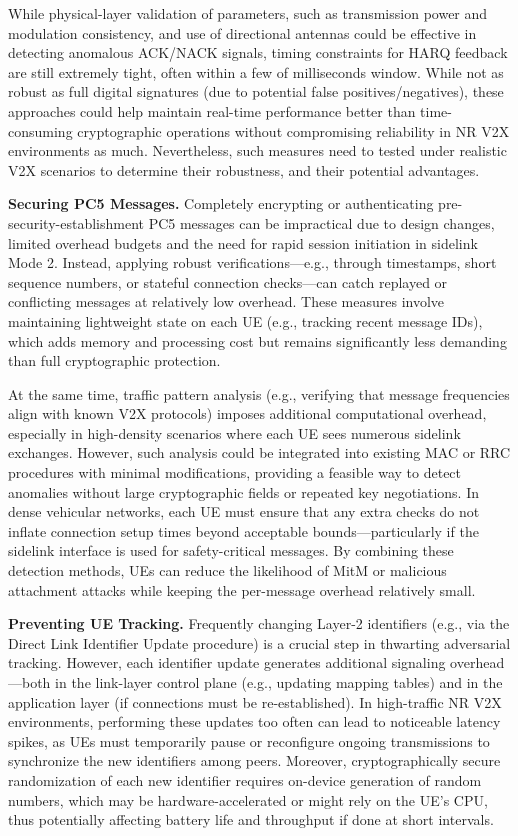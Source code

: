 While physical-layer validation of parameters, such as transmission power and modulation consistency, and use of directional antennas could be effective in detecting anomalous ACK/NACK signals, timing constraints for HARQ feedback are still extremely tight, often within a few of milliseconds window. While not as robust as full digital signatures (due to potential false positives/negatives), these approaches could help maintain real-time performance better than time-consuming cryptographic operations without compromising reliability in NR V2X environments as much. Nevertheless, such measures need to tested under realistic V2X scenarios to determine their robustness, and their potential advantages.

\textbf{Securing PC5 Messages.} Completely encrypting or authenticating pre-security-establishment PC5 messages can be impractical due to design changes, limited overhead budgets and the need for rapid session initiation in sidelink Mode 2. Instead, applying robust verifications—e.g., through timestamps, short sequence numbers, or stateful connection checks—can catch replayed or conflicting messages at relatively low overhead. These measures involve maintaining lightweight state on each UE (e.g., tracking recent message IDs), which adds memory and processing cost but remains significantly less demanding than full cryptographic protection.

At the same time, traffic pattern analysis (e.g., verifying that message frequencies align with known V2X protocols) imposes additional computational overhead, especially in high-density scenarios where each UE sees numerous sidelink exchanges. However, such analysis could be integrated into existing MAC or RRC procedures with minimal modifications, providing a feasible way to detect anomalies without large cryptographic fields or repeated key negotiations. In dense vehicular networks, each UE must ensure that any extra checks do not inflate connection setup times beyond acceptable bounds—particularly if the sidelink interface is used for safety-critical messages. By combining these detection methods, UEs can reduce the likelihood of MitM or malicious attachment attacks while keeping the per-message overhead relatively small.

\textbf{Preventing UE Tracking.} Frequently changing Layer-2 identifiers (e.g., via the Direct Link Identifier Update procedure) is a crucial step in thwarting adversarial tracking. However, each identifier update generates additional signaling overhead—both in the link-layer control plane (e.g., updating mapping tables) and in the application layer (if connections must be re-established). In high-traffic NR V2X environments, performing these updates too often can lead to noticeable latency spikes, as UEs must temporarily pause or reconfigure ongoing transmissions to synchronize the new identifiers among peers. Moreover, cryptographically secure randomization of each new identifier requires on-device generation of random numbers, which may be hardware-accelerated or might rely on the UE’s CPU, thus potentially affecting battery life and throughput if done at short intervals.

